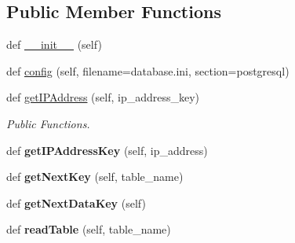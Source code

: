 \subsection*{Public Member Functions}
\begin{DoxyCompactItemize}
\item 
def \mbox{\hyperlink{classDatabaseConnect_1_1DatabaseConnect_ab3f3192b79b2ee40b08242d7ba4a38d1}{\+\_\+\+\_\+init\+\_\+\+\_\+}} (self)
\item 
def \mbox{\hyperlink{classDatabaseConnect_1_1DatabaseConnect_a3623032bef2655d6f2977d5c1bb9c436}{config}} (self, filename=\textquotesingle{}database.\+ini\textquotesingle{}, section=\textquotesingle{}postgresql\textquotesingle{})
\item 
\mbox{\label{classDatabaseConnect_1_1DatabaseConnect_a5bed08ef08598a530738872f1cd0dd4f}} 
def \mbox{\hyperlink{classDatabaseConnect_1_1DatabaseConnect_a5bed08ef08598a530738872f1cd0dd4f}{get\+I\+P\+Address}} (self, ip\+\_\+address\+\_\+key)
\begin{DoxyCompactList}\small\item\em Public Functions. \end{DoxyCompactList}\item 
\mbox{\label{classDatabaseConnect_1_1DatabaseConnect_a27f480be403a24ff2756e3fb8d3258a3}} 
def {\bfseries get\+I\+P\+Address\+Key} (self, ip\+\_\+address)
\item 
\mbox{\label{classDatabaseConnect_1_1DatabaseConnect_ae3eb2be089135dd6ced097f214dd2813}} 
def {\bfseries get\+Next\+Key} (self, table\+\_\+name)
\item 
\mbox{\label{classDatabaseConnect_1_1DatabaseConnect_ae3cfe8b906357dd2b2a048d15b507110}} 
def {\bfseries get\+Next\+Data\+Key} (self)
\item 
\mbox{\label{classDatabaseConnect_1_1DatabaseConnect_a50176193c36b00618ac01532871e344a}} 
def {\bfseries read\+Table} (self, table\+\_\+name)
\item 
\mbox{\label{classDatabaseConnect_1_1DatabaseConnect_a2dc6b452b4324ae6b093fc6d011cbe5a}} 

\end{DoxyCompactItemize}
